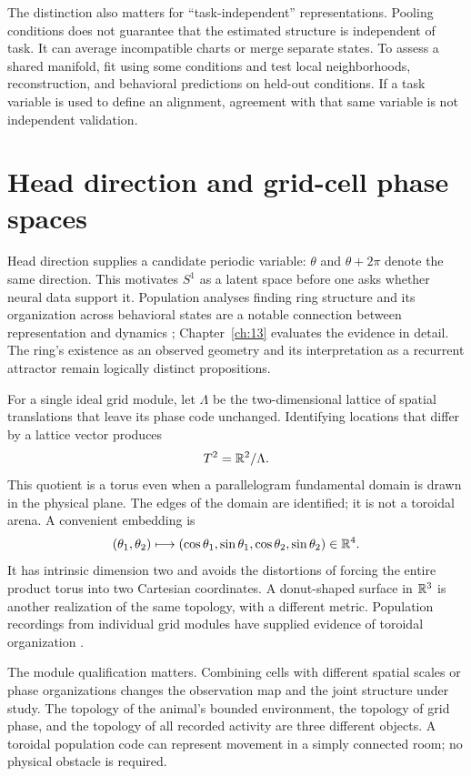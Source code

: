 The distinction also matters for ``task-independent'' representations. Pooling conditions does not guarantee that the estimated structure is independent of task. It can average incompatible charts or merge separate states. To assess a shared manifold, fit using some conditions and test local neighborhoods, reconstruction, and behavioral predictions on held-out conditions. If a task variable is used to define an alignment, agreement with that same variable is not independent validation.

\section{Head direction and grid-cell phase spaces}
Head direction supplies a candidate periodic variable: $\theta$ and $\theta+2\pi$ denote the same direction. This motivates $S^1$ as a latent space before one asks whether neural data support it. Population analyses finding ring structure and its organization across behavioral states are a notable connection between representation and dynamics \citep{app_chaudhuri2019}; Chapter~\ref{ch:13} evaluates the evidence in detail. The ring's existence as an observed geometry and its interpretation as a recurrent attractor remain logically distinct propositions.

For a single ideal grid module, let $\Lambda$ be the two-dimensional lattice of spatial translations that leave its phase code unchanged. Identifying locations that differ by a lattice vector produces
\begin{equation}
 T^2=\mathbb{R}^2/\Lambda.
\end{equation}
This quotient is a torus even when a parallelogram fundamental domain is drawn in the physical plane. The edges of the domain are identified; it is not a toroidal arena. A convenient embedding is
\[
 (\theta_1,\theta_2)\longmapsto
 (\cos\theta_1,\sin\theta_1,\cos\theta_2,\sin\theta_2)\in\mathbb{R}^4.
\]
It has intrinsic dimension two and avoids the distortions of forcing the entire product torus into two Cartesian coordinates. A donut-shaped surface in $\mathbb{R}^3$ is another realization of the same topology, with a different metric. Population recordings from individual grid modules have supplied evidence of toroidal organization \citep{app_gardner2022}.

The module qualification matters. Combining cells with different spatial scales or phase organizations changes the observation map and the joint structure under study. The topology of the animal's bounded environment, the topology of grid phase, and the topology of all recorded activity are three different objects. A toroidal population code can represent movement in a simply connected room; no physical obstacle is required.

